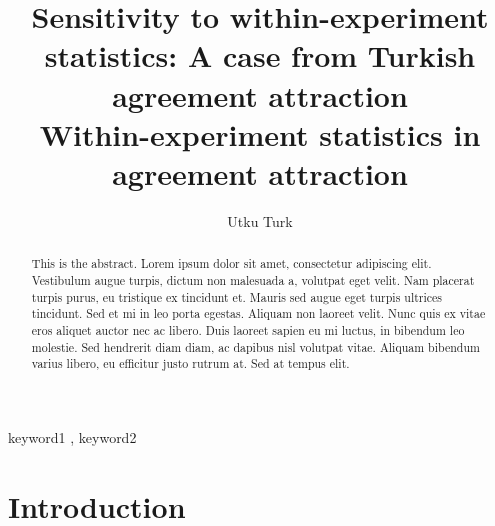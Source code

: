 \documentclass[
  authoryear,
  preprint]{elsarticle}
\begin{document}
\begin{frontmatter}
\title{Sensitivity to within-experiment statistics: A case from Turkish
agreement attraction \\\large{Within-experiment statistics in agreement
attraction} }
\author[1]{Utku Turk%
%
}



        
\begin{abstract}
This is the abstract. Lorem ipsum dolor sit amet, consectetur adipiscing
elit. Vestibulum augue turpis, dictum non malesuada a, volutpat eget
velit. Nam placerat turpis purus, eu tristique ex tincidunt et. Mauris
sed augue eget turpis ultrices tincidunt. Sed et mi in leo porta
egestas. Aliquam non laoreet velit. Nunc quis ex vitae eros aliquet
auctor nec ac libero. Duis laoreet sapien eu mi luctus, in bibendum leo
molestie. Sed hendrerit diam diam, ac dapibus nisl volutpat vitae.
Aliquam bibendum varius libero, eu efficitur justo rutrum at. Sed at
tempus elit.
\end{abstract}





\begin{keyword}
    keyword1 \sep 
    keyword2
\end{keyword}
\end{frontmatter}
    

\section{Introduction}\label{introduction}
\end{document}
